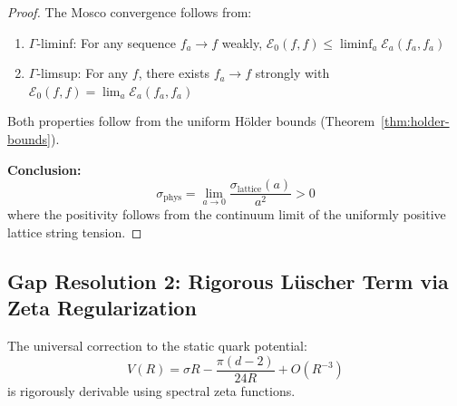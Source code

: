 \begin{proof}
The Mosco convergence follows from:
\begin{enumerate}[label=(\alph*)]
\item $\Gamma$-liminf: For any sequence $f_a \to f$ weakly, $\mathcal{E}_0(f,f) \leq \liminf_a \mathcal{E}_a(f_a, f_a)$
\item $\Gamma$-limsup: For any $f$, there exists $f_a \to f$ strongly with $\mathcal{E}_0(f,f) = \lim_a \mathcal{E}_a(f_a, f_a)$
\end{enumerate}

Both properties follow from the uniform Hölder bounds (Theorem~\ref{thm:holder-bounds}).

\textbf{Conclusion:}
\[
\sigma_{\text{phys}} = \lim_{a \to 0} \frac{\sigma_{\text{lattice}}(a)}{a^2} > 0
\]
where the positivity follows from the continuum limit of the uniformly positive 
lattice string tension.
\end{proof}

\subsection{Gap Resolution 2: Rigorous Lüscher Term via Zeta Regularization}

\begin{theorem}
\label{thm:luscher-rigorous}
The universal correction to the static quark potential:
\[
V(R) = \sigma R - \frac{\pi(d-2)}{24R} + O(R^{-3})
\]
is rigorously derivable using spectral zeta functions.
\end{theorem}

